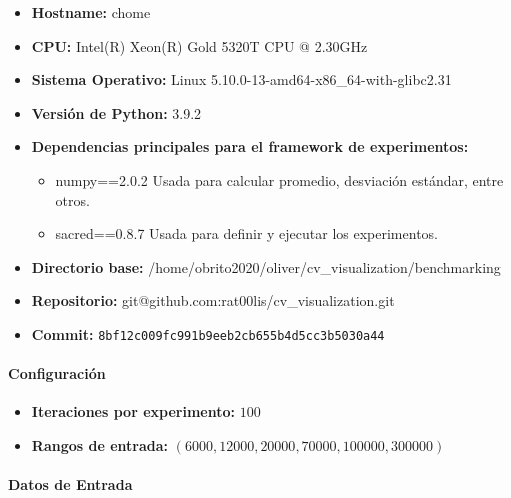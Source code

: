 \begin{itemize}
    \item \textbf{Hostname:} chome
    \item \textbf{CPU:} Intel(R) Xeon(R) Gold 5320T CPU @ 2.30GHz
    \item \textbf{Sistema Operativo:} Linux 5.10.0-13-amd64-x86\_64-with-glibc2.31
    \item \textbf{Versión de Python:} 3.9.2
    \item \textbf{Dependencias principales para el framework de experimentos:}
    \begin{itemize}
        \item numpy==2.0.2
            Usada para calcular promedio, desviación estándar, entre otros.
        \item sacred==0.8.7
            Usada para definir y ejecutar los experimentos.
    \end{itemize}
    \item \textbf{Directorio base:} /home/obrito2020/oliver/cv\_visualization/benchmarking
    \item \textbf{Repositorio:} git@github.com:rat00lis/cv\_visualization.git
    \item \textbf{Commit:} \texttt{8bf12c009fc991b9eeb2cb655b4d5cc3b5030a44}
\end{itemize}

\paragraph{Configuración}

\begin{itemize}
    \item \textbf{Iteraciones por experimento:} $100$
    \item \textbf{Rangos de entrada:} $(6000, 12000, 20000, 70000, 100000, 300000)$
\end{itemize}

\paragraph{Datos de Entrada}

